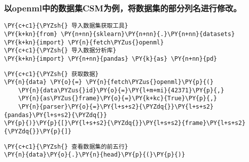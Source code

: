     \hypertarget{ux4ee5openmlux4e2dux7684ux6570ux636eux96c6csmux4e3aux4f8bux5c06ux6570ux636eux96c6ux7684ux90e8ux5206ux5217ux540dux8fdbux884cux4feeux6539}{%
\subsubsection{以openml中的数据集CSM为例，将数据集的部分列名进行修改。}\label{ux4ee5openmlux4e2dux7684ux6570ux636eux96c6csmux4e3aux4f8bux5c06ux6570ux636eux96c6ux7684ux90e8ux5206ux5217ux540dux8fdbux884cux4feeux6539}}

    \begin{tcolorbox}[breakable, size=fbox, boxrule=1pt, pad at break*=1mm,colback=cellbackground, colframe=cellborder]
\begin{Verbatim}[commandchars=\\\{\}]
\PY{c+c1}{\PYZsh{} 导入数据集获取工具}
\PY{k+kn}{from} \PY{n+nn}{sklearn}\PY{n+nn}{.}\PY{n+nn}{datasets} \PY{k+kn}{import} \PY{n}{fetch\PYZus{}openml}
\PY{c+c1}{\PYZsh{} 导入数据分析库}
\PY{k+kn}{import} \PY{n+nn}{pandas} \PY{k}{as} \PY{n+nn}{pd}
\end{Verbatim}
\end{tcolorbox}

    \begin{tcolorbox}[breakable, size=fbox, boxrule=1pt, pad at break*=1mm,colback=cellbackground, colframe=cellborder]
\begin{Verbatim}[commandchars=\\\{\}]
\PY{c+c1}{\PYZsh{} 获取数据}
\PY{n}{data} \PY{o}{=} \PY{n}{fetch\PYZus{}openml}\PY{p}{(}
    \PY{n}{data\PYZus{}id}\PY{o}{=}\PY{l+m+mi}{42371}\PY{p}{,}
    \PY{n}{as\PYZus{}frame}\PY{o}{=}\PY{k+kc}{True}\PY{p}{,}
    \PY{n}{parser}\PY{o}{=}\PY{l+s+s2}{\PYZdq{}}\PY{l+s+s2}{pandas}\PY{l+s+s2}{\PYZdq{}}
\PY{p}{)}\PY{p}{[}\PY{l+s+s2}{\PYZdq{}}\PY{l+s+s2}{frame}\PY{l+s+s2}{\PYZdq{}}\PY{p}{]}
\end{Verbatim}
\end{tcolorbox}

    \begin{tcolorbox}[breakable, size=fbox, boxrule=1pt, pad at break*=1mm,colback=cellbackground, colframe=cellborder]
\begin{Verbatim}[commandchars=\\\{\}]
\PY{c+c1}{\PYZsh{} 查看数据集的前五行}
\PY{n}{data}\PY{o}{.}\PY{n}{head}\PY{p}{(}\PY{p}{)}
\end{Verbatim}
\end{tcolorbox}

